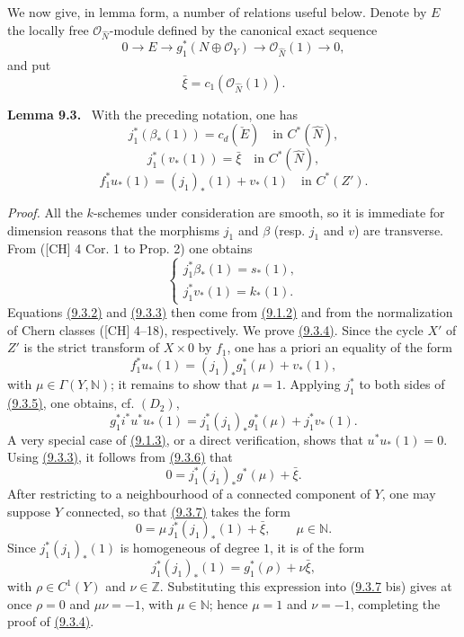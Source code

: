 \documentclass[11pt]{article}
\newenvironment{statement}[1]{\par\medskip\noindent\textbf{#1.}\ }{\par\medskip}
\begin{document}
We now give, in lemma form, a number of relations useful below. Denote by $E$ the locally free $\mathcal O_{\widehat N}$-module defined by the canonical exact sequence
\[
0\to E\to g_1^*(N\oplus\mathcal O_Y)\to\mathcal O_{\widehat N}(1)\to0,
\tag{9.3.0}\label{sga5:VII:equation:9.3.0}
\]
and put
\[
\bar\xi=c_1(\mathcal O_{\widehat N}(1)).
\tag{9.3.1}\label{sga5:VII:equation:9.3.1}
\]

\label{sga5:VII:lemma:9.3}\begin{statement}{Lemma 9.3}
With the preceding notation, one has
\[
j_1^*(\beta_*(1))=c_d(\check E)\quad\text{in }C^*(\widehat N),
\tag{9.3.2}\label{sga5:VII:equation:9.3.2}
\]
\[
j_1^*(v_*(1))=\bar\xi\quad\text{in }C^*(\widehat N),
\tag{9.3.3}\label{sga5:VII:equation:9.3.3}
\]
\[
f_1^*u_*(1)=(j_1)_*(1)+v_*(1)\quad\text{in }C^*(Z').
\tag{9.3.4}\label{sga5:VII:equation:9.3.4}
\]
\end{statement}

\emph{Proof.} All the $k$-schemes under consideration are smooth, so it is immediate for dimension reasons that the morphisms $j_1$ and $\beta$ (resp. $j_1$ and $v$) are transverse. From ([CH] 4 Cor. 1 to Prop. 2) one obtains
\[
\begin{cases}
j_1^*\beta_*(1)=s_*(1),\\
j_1^*v_*(1)=k_*(1).
\end{cases}
\]
Equations \hyperref[sga5:VII:equation:9.3.2]{(9.3.2)} and \hyperref[sga5:VII:equation:9.3.3]{(9.3.3)} then come from \hyperref[sga5:VII:equation:9.1.2]{(9.1.2)} and from the normalization of Chern classes ([CH] 4--18), respectively. We prove \hyperref[sga5:VII:equation:9.3.4]{(9.3.4)}. Since the cycle $X'$ of $Z'$ is the strict transform of $X\times0$ by $f_1$, one has a priori an equality of the form
\[
f_1^*u_*(1)=(j_1)_*g_1^*(\mu)+v_*(1),
\tag{9.3.5}\label{sga5:VII:equation:9.3.5}
\]
with $\mu\in\Gamma(Y,\mathbb N)$; it remains to show that $\mu=1$. Applying $j_1^*$ to both sides of \hyperref[sga5:VII:equation:9.3.5]{(9.3.5)}, one obtains, cf. $(D_2)$,
\[
g_1^*i^*u^*u_*(1)=j_1^*(j_1)_*g_1^*(\mu)+j_1^*v_*(1).
\tag{9.3.6}\label{sga5:VII:equation:9.3.6}
\]
A very special case of \hyperref[sga5:VII:equation:9.1.3]{(9.1.3)}, or a direct verification, shows that $u^*u_*(1)=0$. Using \hyperref[sga5:VII:equation:9.3.3]{(9.3.3)}, it follows from \hyperref[sga5:VII:equation:9.3.6]{(9.3.6)} that
\[
0=j_1^*(j_1)_*g^*(\mu)+\bar\xi.
\tag{9.3.7}\label{sga5:VII:equation:9.3.7}
\]
After restricting to a neighbourhood of a connected component of $Y$, one may suppose $Y$ connected, so that \hyperref[sga5:VII:equation:9.3.7]{(9.3.7)} takes the form
\[
0=\mu\,j_1^*(j_1)_*(1)+\bar\xi,\qquad \mu\in\mathbb N.
\tag{9.3.7 bis}\label{sga5:VII:equation:9.3.7-bis}
\]
Since $j_1^*(j_1)_*(1)$ is homogeneous of degree $1$, it is of the form
\[
j_1^*(j_1)_*(1)=g_1^*(\rho)+\nu\bar\xi,
\]
with $\rho\in C^1(Y)$ and $\nu\in\mathbb Z$. Substituting this expression into (\hyperref[sga5:VII:equation:9.3.7]{9.3.7} bis) gives at once $\rho=0$ and $\mu\nu=-1$, with $\mu\in\mathbb N$; hence $\mu=1$ and $\nu=-1$, completing the proof of \hyperref[sga5:VII:equation:9.3.4]{(9.3.4)}.
\end{document}
